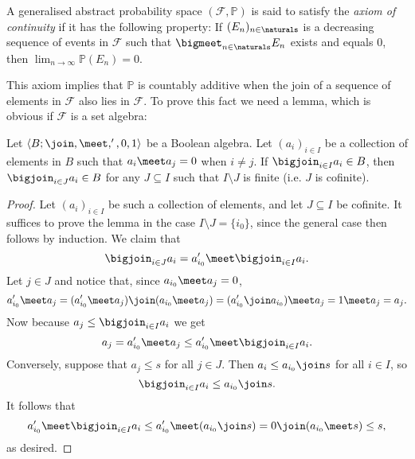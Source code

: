 \documentclass[article, a4paper, 11pt, oneside]{memoir}
\numberwithin{equation}{chapter}
\newcommand{\calF}{\mathcal{F}}
\renewcommand{\P}{\mathbb{P}}
\begin{document}
\begin{definition}
    A generalised abstract probability space $(\calF, \P)$ is said to satisfy the \emph{axiom of continuity} if it has the following property: If $(E_n)_{n\in\naturals}$ is a decreasing sequence of events in $\calF$ such that $\bigmeet_{n\in\naturals} E_n$ exists and equals $0$, then $\lim_{n\to\infty} \P(E_n) = 0$.
\end{definition}
%
This axiom implies that $\P$ is countably additive when the join of a sequence of elements in $\calF$ also lies in $\calF$. To prove this fact we need a lemma, which is obvious if $\calF$ is a set algebra:

\begin{lemma}
    \label{thm:refine_join}
    Let $\langle B; \join, \meet, ', 0, 1 \rangle$ be a Boolean algebra. Let $(a_i)_{i \in I}$ be a collection of elements in $B$ such that $a_i \meet a_j = 0$ when $i \neq j$. If $\bigjoin_{i \in I} a_i \in B$, then $\bigjoin_{i \in J} a_i \in B$ for any $J \subseteq I$ such that $I \setminus J$ is finite (i.e. $J$ is cofinite).
\end{lemma}

\begin{proof}
    Let $(a_i)_{i \in I}$ be such a collection of elements, and let $J \subseteq I$ be cofinite. It suffices to prove the lemma in the case $I \setminus J = \{i_0\}$, since the general case then follows by induction. We claim that
    \begin{equation*}
        \bigjoin_{i \in J} a_i
            = a_{i_0}' \meet \bigjoin_{i \in I} a_i.
    \end{equation*}
    Let $j \in J$ and notice that, since $a_{i_0} \meet a_j = 0$,
    \begin{equation*}
        a_{i_0}' \meet a_j
            = (a_{i_0}' \meet a_j) \join (a_{i_0} \meet a_j)
            = (a_{i_0}' \join a_{i_0}) \meet a_j
            = 1 \meet a_j
            = a_j.
    \end{equation*}
    Now because $a_j \leq \bigjoin_{i \in I} a_i$ we get
    \begin{equation*}
        a_j
            = a_{i_0}' \meet a_j
            \leq a_{i_0}' \meet \bigjoin_{i \in I} a_i.
    \end{equation*}
    Conversely, suppose that $a_j \leq s$ for all $j \in J$. Then $a_i \leq a_{i_0} \join s$ for all $i \in I$, so
    \begin{equation*}
        \bigjoin_{i \in I} a_i
            \leq a_{i_0} \join s.
    \end{equation*}
    It follows that
    \begin{equation*}
        a_{i_0}' \meet \bigjoin_{i \in I} a_i
            \leq a_{i_0}' \meet (a_{i_0} \join s)
            = 0 \join (a_{i_0} \meet s)
            \leq s,
    \end{equation*}
    as desired.
\end{proof}
\end{document}
